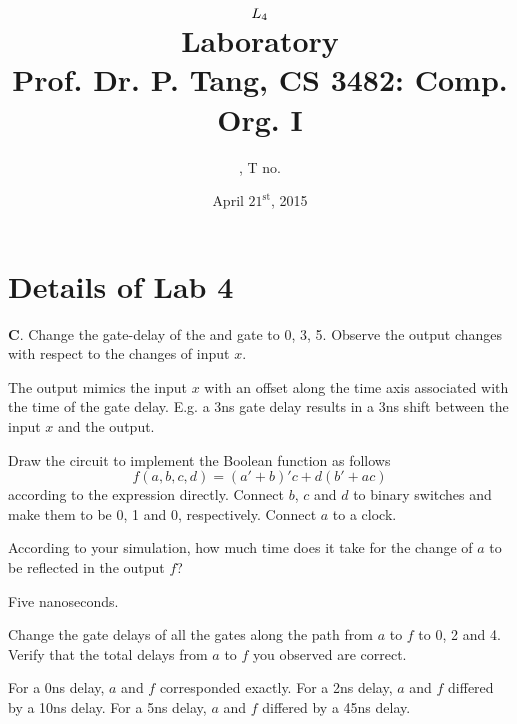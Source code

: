 \documentclass[11pt]{article}
\title{
	$L_{4}$ \\
	{\large Laboratory \rom{\lab}} \\
	{\normalsize Prof. Dr. P. Tang, CS 3482: Comp. Org. I}
}
\author{
	\name, T no. \tno
}
\date{April $21^{\text{st}}$, 2015}
\begin{document}
\maketitle

\section{Details of Lab 4}

\begin{question}
	{\bf C}. Change the gate-delay of the {\sc and} gate to 0, 3, 5. Observe the output
	changes with respect to the changes of input $x$.

	The output mimics the input $x$ with an offset along the time axis associated with the time
	of the gate delay. E.g. a 3ns gate delay results in a 3ns shift between the input $x$ and the
	output.
\end{question}

\begin{question}
	Draw the circuit to implement the Boolean function as follows
	\[f(a,b,c,d) = (a' + b)'c + d(b' + ac)\] according to the expression directly.
	Connect $b$, $c$ and $d$ to binary switches and make them to be 0, 1 and 0, respectively.
	Connect $a$ to a clock.

	\begin{subquestion}
		According to your simulation, how much time does it take for the change of $a$ to be
		reflected in the output $f$?

		Five nanoseconds.
	\end{subquestion}

	\begin{subquestion}
		Change the gate delays of all the gates along the path from $a$ to $f$ to 0, 2 and 4.
		Verify that the total delays from $a$ to $f$ you observed are correct.

		For a 0ns delay, $a$ and $f$ corresponded exactly. For a 2ns delay, $a$ and $f$ differed by a 10ns delay.
		For a 5ns delay, $a$ and $f$ differed by a 45ns delay.
	\end{subquestion}


\end{question}
\end{document}
